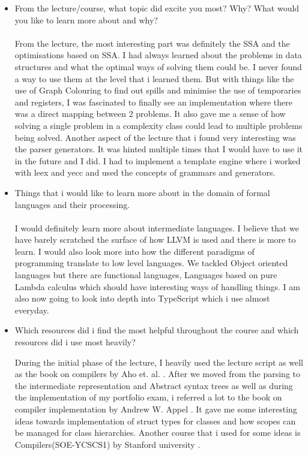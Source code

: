 \documentclass[]{tukportfolio}
\begin{document}
\begin{itemize}
	\item From the lecture/course, what topic did excite you most? Why? What would you like to learn more about and why?\\\\
	From the lecture, the most interesting part was definitely the SSA and the optimisations based on SSA. I had always learned about the problems in data structures and what the optimal ways of solving them could be. I never found a way to use them at the level that i learned them. But with things like the use of Graph Colouring to find out spills and minimise the use of temporaries and registers, I was fascinated to finally see an implementation where there was a direct mapping between 2 problems. It also gave me a sense of how solving a single problem in a complexity class could lead to multiple problems being solved. Another aspect of the lecture that i found very interesting was the parser generators. It was hinted multiple times that I would have to use it in the future and I did. I had to implement a template engine where i worked with leex and yecc and used the concepts of grammars and generators.
	
	\item Things that i would like to learn more about in the domain of formal languages and their processing.\\\\
	
	I would definitely learn more about intermediate languages. I believe that we have barely scratched the surface of how LLVM is used and there is more to learn. I would also look more into how the different paradigms of programming translate to low level languages. We tackled Object oriented languages but there are functional languages, Languages based on pure Lambda calculus which should have interesting ways of handling things. I am also now going to look into depth into TypeScript which i use almost everyday.
	
	\item Which resources did i find the most helpful throughout the course and which resources did i use most heavily?
	
	During the initial phase of the lecture, I heavily used the lecture script as well as the book on compilers by Aho et. al. \cite{DBLP:books/aw/AhoSU86}. After we moved from the parsing to the intermediate representation and Abstract syntax trees as well as during the implementation of my portfolio exam, i referred a lot to the book on compiler implementation by Andrew W. Appel \cite{DBLP:books/cu/Appel1998}. It gave me some interesting ideas towards implementation of struct types for classes and how scopes can be managed for class hierarchies. Another course that i used for some ideas is Compilers(SOE-YCSCS1) by Stanford university \cite{aiken}.
	
	
\end{itemize}
\newpage
\nocite{*}


\end{document}
